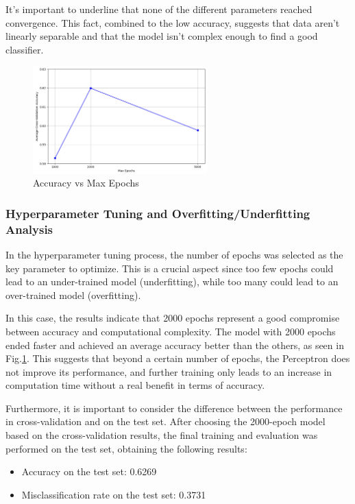 \documentclass[a4paper, 10pt]{article}
\begin{document}
It's important to underline that none of the different parameters reached convergence. This fact, combined to the low accuracy, suggests that data aren't linearly separable and that the model isn't complex enough to find a good classifier.

\begin{figure}[H]
    \centering
    \includegraphics[width=0.6\textwidth]{images/perceptron.png}
    \caption{Accuracy vs Max Epochs}
    \label{fig:accuracyperc}
\end{figure}

\subsubsection{Hyperparameter Tuning and Overfitting/Underfitting Analysis}

In the hyperparameter tuning process, the number of epochs was selected as the key parameter to optimize. This is a crucial aspect since too few epochs could lead to an under-trained model (underfitting), while too many could lead to an over-trained model (overfitting).

In this case, the results indicate that 2000 epochs represent a good compromise between accuracy and computational complexity. The model with 2000 epochs ended faster and achieved an average accuracy better than the others, as seen in Fig.\ref{fig:accuracyperc}. This suggests that beyond a certain number of epochs, the Perceptron does not improve its performance, and further training only leads to an increase in computation time without a real benefit in terms of accuracy.

Furthermore, it is important to consider the difference between the performance in cross-validation and on the test set. After choosing the 2000-epoch model based on the cross-validation results, the final training and evaluation was performed on the test set, obtaining the following results:

\begin{itemize}
    \item Accuracy on the test set: 0.6269
    \item Misclassification rate on the test set: 0.3731
\end{itemize}
\end{document}
